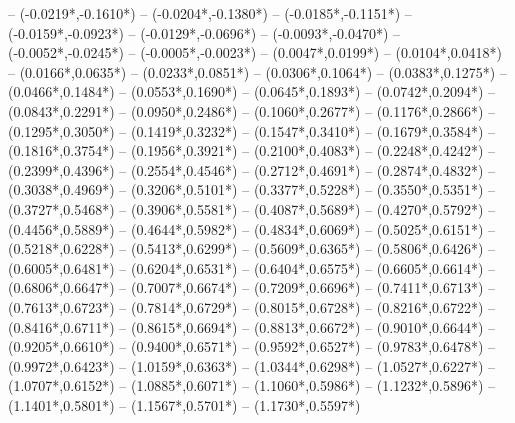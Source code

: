 {	-- ({-0.0219*\dx},{-0.1610*\dy})
	-- ({-0.0204*\dx},{-0.1380*\dy})
	-- ({-0.0185*\dx},{-0.1151*\dy})
	-- ({-0.0159*\dx},{-0.0923*\dy})
	-- ({-0.0129*\dx},{-0.0696*\dy})
	-- ({-0.0093*\dx},{-0.0470*\dy})
	-- ({-0.0052*\dx},{-0.0245*\dy})
	-- ({-0.0005*\dx},{-0.0023*\dy})
	-- ({0.0047*\dx},{0.0199*\dy})
	-- ({0.0104*\dx},{0.0418*\dy})
	-- ({0.0166*\dx},{0.0635*\dy})
	-- ({0.0233*\dx},{0.0851*\dy})
	-- ({0.0306*\dx},{0.1064*\dy})
	-- ({0.0383*\dx},{0.1275*\dy})
	-- ({0.0466*\dx},{0.1484*\dy})
	-- ({0.0553*\dx},{0.1690*\dy})
	-- ({0.0645*\dx},{0.1893*\dy})
	-- ({0.0742*\dx},{0.2094*\dy})
	-- ({0.0843*\dx},{0.2291*\dy})
	-- ({0.0950*\dx},{0.2486*\dy})
	-- ({0.1060*\dx},{0.2677*\dy})
	-- ({0.1176*\dx},{0.2866*\dy})
	-- ({0.1295*\dx},{0.3050*\dy})
	-- ({0.1419*\dx},{0.3232*\dy})
	-- ({0.1547*\dx},{0.3410*\dy})
	-- ({0.1679*\dx},{0.3584*\dy})
	-- ({0.1816*\dx},{0.3754*\dy})
	-- ({0.1956*\dx},{0.3921*\dy})
	-- ({0.2100*\dx},{0.4083*\dy})
	-- ({0.2248*\dx},{0.4242*\dy})
	-- ({0.2399*\dx},{0.4396*\dy})
	-- ({0.2554*\dx},{0.4546*\dy})
	-- ({0.2712*\dx},{0.4691*\dy})
	-- ({0.2874*\dx},{0.4832*\dy})
	-- ({0.3038*\dx},{0.4969*\dy})
	-- ({0.3206*\dx},{0.5101*\dy})
	-- ({0.3377*\dx},{0.5228*\dy})
	-- ({0.3550*\dx},{0.5351*\dy})
	-- ({0.3727*\dx},{0.5468*\dy})
	-- ({0.3906*\dx},{0.5581*\dy})
	-- ({0.4087*\dx},{0.5689*\dy})
	-- ({0.4270*\dx},{0.5792*\dy})
	-- ({0.4456*\dx},{0.5889*\dy})
	-- ({0.4644*\dx},{0.5982*\dy})
	-- ({0.4834*\dx},{0.6069*\dy})
	-- ({0.5025*\dx},{0.6151*\dy})
	-- ({0.5218*\dx},{0.6228*\dy})
	-- ({0.5413*\dx},{0.6299*\dy})
	-- ({0.5609*\dx},{0.6365*\dy})
	-- ({0.5806*\dx},{0.6426*\dy})
	-- ({0.6005*\dx},{0.6481*\dy})
	-- ({0.6204*\dx},{0.6531*\dy})
	-- ({0.6404*\dx},{0.6575*\dy})
	-- ({0.6605*\dx},{0.6614*\dy})
	-- ({0.6806*\dx},{0.6647*\dy})
	-- ({0.7007*\dx},{0.6674*\dy})
	-- ({0.7209*\dx},{0.6696*\dy})
	-- ({0.7411*\dx},{0.6713*\dy})
	-- ({0.7613*\dx},{0.6723*\dy})
	-- ({0.7814*\dx},{0.6729*\dy})
	-- ({0.8015*\dx},{0.6728*\dy})
	-- ({0.8216*\dx},{0.6722*\dy})
	-- ({0.8416*\dx},{0.6711*\dy})
	-- ({0.8615*\dx},{0.6694*\dy})
	-- ({0.8813*\dx},{0.6672*\dy})
	-- ({0.9010*\dx},{0.6644*\dy})
	-- ({0.9205*\dx},{0.6610*\dy})
	-- ({0.9400*\dx},{0.6571*\dy})
	-- ({0.9592*\dx},{0.6527*\dy})
	-- ({0.9783*\dx},{0.6478*\dy})
	-- ({0.9972*\dx},{0.6423*\dy})
	-- ({1.0159*\dx},{0.6363*\dy})
	-- ({1.0344*\dx},{0.6298*\dy})
	-- ({1.0527*\dx},{0.6227*\dy})
	-- ({1.0707*\dx},{0.6152*\dy})
	-- ({1.0885*\dx},{0.6071*\dy})
	-- ({1.1060*\dx},{0.5986*\dy})
	-- ({1.1232*\dx},{0.5896*\dy})
	-- ({1.1401*\dx},{0.5801*\dy})
	-- ({1.1567*\dx},{0.5701*\dy})
	-- ({1.1730*\dx},{0.5597*\dy})
}
